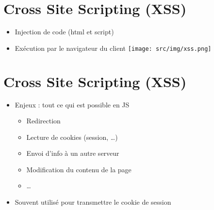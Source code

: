 \hypertarget{cross-site-scripting-xss}{%
\section{Cross Site Scripting (XSS)}\label{cross-site-scripting-xss}}

\begin{itemize}
\tightlist
\item
  Injection de code (html et script)
\item
  Exécution par le navigateur du client
  \texttt{[image: src/img/xss.png]}
\end{itemize}

\hypertarget{cross-site-scripting-xss-1}{%
\section{Cross Site Scripting (XSS)}\label{cross-site-scripting-xss-1}}

\begin{itemize}
\tightlist
\item
  Enjeux : tout ce qui est possible en JS

  \begin{itemize}
  \tightlist
  \item
    Redirection
  \item
    Lecture de cookies (session, \ldots)
  \item
    Envoi d'info à un autre serveur
  \item
    Modification du contenu de la page
  \item
    \ldots{}
  \end{itemize}
\item
  Souvent utilisé pour transmettre le cookie de session
\end{itemize}

\begin{english}

\begin{Shaded}
\begin{Highlighting}[]
\KeywordTok{\textgreater{}}
\end{Highlighting}
\end{Shaded}

\end{english}

